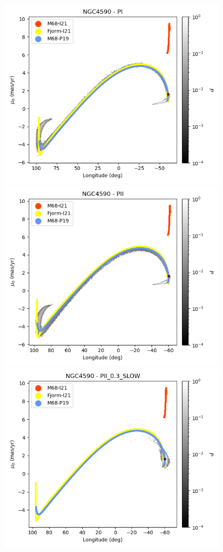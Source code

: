 \begin{figure}
\begin{center}
                    \includegraphics[clip=true, trim = 0mm 0mm 0mm 0mm, width=0.65\columnwidth]{images/PI_individual_NGC4590_galstream-NGC4590-l-pm_b.png}
                    \includegraphics[clip=true, trim = 0mm 0mm 0mm 0mm, width=0.65\columnwidth]{images/PII_individual_NGC4590_galstream-NGC4590-l-pm_b.png}
                    \includegraphics[clip=true, trim = 0mm 0mm 0mm 0mm, width=0.65\columnwidth]{images/PII_0.3_SLOW_individual_NGC4590_galstream-NGC4590-l-pm_b.png}


\end{center}
\end{figure}
